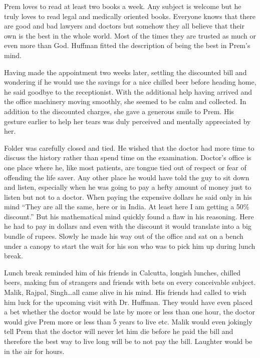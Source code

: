 Prem loves to read at least two books a week. Any subject is welcome but
he truly loves to read legal and medically oriented books. Everyone
knows that there are good and bad lawyers and doctors but somehow they
all believe that their own is the best in the whole world. Most of the
times they are trusted as much or even more than God. Huffman fitted the
description of being the best in Prem's mind.

Having made the appointment two weeks later, settling the discounted
bill and wondering if he would use the savings for a nice chilled beer
before heading home, he said goodbye to the receptionist. With the
additional help having arrived and the office machinery moving smoothly,
she seemed to be calm and collected. In addition to the discounted
charges, she gave a generous smile to Prem. His gesture earlier to help
her tears was duly perceived and mentally appreciated by her.

Folder was carefully closed and tied. He wished that the doctor had more
time to discuss the history rather than spend time on the examination.
Doctor's office is one place where he, like most patients, are tongue
tied out of respect or fear of offending the life saver. Any other place
he would have told the guy to sit down and listen, especially when he
was going to pay a hefty amount of money just to listen but not to a
doctor. When paying the expensive dollars he said only in his mind
``They are all the same, here or in India. At least here I am getting a
50\% discount.'' But his mathematical mind quickly found a flaw in his
reasoning. Here he had to pay in dollars and even with the discount it
would translate into a big bundle of rupees. Slowly he made his way out
of the office and sat on a bench under a canopy to start the wait for
his son who was to pick him up during lunch break.

Lunch break reminded him of his friends in Calcutta, longish lunches,
chilled beers, making fun of strangers and friends with bets on every
conceivable subject. Malik, Rajpal, Singh\ldots{}all came alive in his
mind. His friends had called to wish him luck for the upcoming visit
with Dr. Huffman. They would have even placed a bet whether the doctor
would be late by more or less than one hour, the doctor would give Prem
more or less than 5 years to live etc. Malik would even jokingly tell
Prem that the doctor will never let him die before he paid the bill and
therefore the best way to live long will be to not pay the bill.
Laughter would be in the air for hours.

